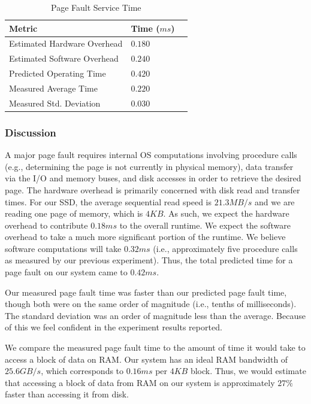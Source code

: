 \documentclass[sigconf]{acmart}
\begin{document}
\begin{table}[!ht]
\centering
\caption{Page Fault Service Time}
\begin{tabular}{|l|l|l|}
\hline
\textbf{Metric}             	& \textbf{Time ($ms$)}	\\ \hline
Estimated Hardware Overhead 	& $0.180$				\\ \hline
Estimated Software Overhead 	& $0.240$				\\ \hline
Predicted Operating Time    	& $0.420$				\\ \hline
Measured Average Time     		& $0.220$				\\ \hline
Measured Std. Deviation 		& $0.030$				\\ \hline
\end{tabular}
\label{PageFaultResults}
\end{table}

\subsubsection{Discussion}
A major page fault requires internal OS computations involving procedure calls (e.g., determining the page is not currently in physical memory), data transfer via the I/O and memory buses, and disk accesses in order to retrieve the desired page. The hardware overhead is primarily concerned with disk read and transfer times. For our SSD, the average sequential read speed is $21.3MB/s$ \cite{ssdrating} and we are reading one page of memory, which is $4KB$. As such, we expect the hardware overhead to contribute $0.18 ms$ to the overall runtime. We expect the software overhead to take a much more significant portion of the runtime. We believe software computations will take $0.32ms$ (i.e., approximately five procedure calls as measured by our previous experiment). Thus, the total predicted time for a page fault on our system came to $0.42ms$.

Our measured page fault time was faster than our predicted page fault time, though both were on the same order of magnitude (i.e., tenths of milliseconds). The standard deviation was an order of magnitude less than the average. Because of this we feel confident in the experiment results reported.

We compare the measured page fault time to the amount of time it would take to access a block of data on RAM. Our system has an ideal RAM bandwidth of $25.6GB/s$, which corresponds to $0.16ms$ per $4KB$ block. Thus, we would estimate that accessing a block of data from RAM on our system is approximately $27\%$ faster than accessing it from disk.
\end{document}
